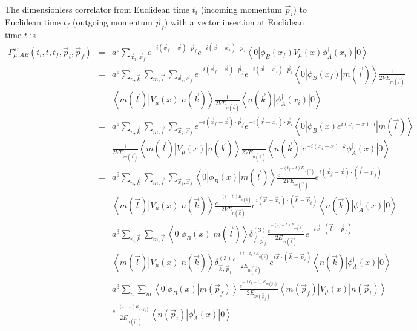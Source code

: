 \documentclass[12pt]{article}
\begin{document}
The dimensionless correlator from Euclidean time $t_i$ (incoming momentum
${\vec p}_i$) to Euclidean time $t_f$ (outgoing momentum $\vec{p}_f$) with a
vector insertion at Euclidean time $t$ is
\begin{eqnarray}
\Gamma^{\pi\pi}_{\mu,AB}(t_i,t,t_f,\vec{p}_i,\vec{p}_f)
 &=& a^9\sum_{\vec{x}_i,\vec{x}_f}e^{-i(\vec{x}_f-\vec{x})\cdot\vec{p}_f}
     e^{-i(\vec{x}-\vec{x}_i)\cdot\vec{p}_i}
     \left<0\left|\phi_B(x_f)V_\mu(x)\phi_A^\dagger(x_i)\right|0\right>
     \nonumber \\
 &=& a^9\sum_{n,\vec{k}}\sum_{m,\vec{l}}\sum_{\vec{x}_i,\vec{x}_f}
     e^{-i(\vec{x}_f-\vec{x})\cdot\vec{p}_f}
     e^{-i(\vec{x}-\vec{x}_i)\cdot\vec{p}_i}
     \left<0\left|\phi_B(x_f)\right|m(\vec{l})\right>
     \frac{1}{2VE_{m(\vec{l})}} \nonumber \\
  && \left<m(\vec{l})\left|V_\mu(x)\right|n(\vec{k})\right>
     \frac{1}{2VE_{n(\vec{k})}}
     \left<n(\vec{k})\left|\phi_A^\dagger(x_i)\right|0\right> \nonumber \\
 &=& a^9\sum_{n,\vec{k}}\sum_{m,\vec{l}}\sum_{\vec{x}_i,\vec{x}_f}
     e^{-i(\vec{x}_f-\vec{x})\cdot\vec{p}_f}
     e^{-i(\vec{x}-\vec{x}_i)\cdot\vec{p}_i}
     \left<0\left|\phi_B(x)e^{i(x_f-x)\cdot l}\right|m(\vec{l})\right>
     \nonumber \\
  && \frac{1}{2VE_{m(\vec{l})}}
     \left<m(\vec{l})\left|V_\mu(x)\right|n(\vec{k})\right>
     \frac{1}{2VE_{n(\vec{k})}}
     \left<n(\vec{k})\left|e^{-i(x_i-x)\cdot k}\phi_A^\dagger(x)\right|0\right>
     \nonumber \\
 &=& a^9\sum_{n,\vec{k}}\sum_{m,\vec{l}}\sum_{\vec{x}_i,\vec{x}_f}
     \left<0\left|\phi_B(x)\right|m(\vec{l})\right>
     \frac{e^{-(t_f-t)E_{m(\vec{l})}}}{2VE_{m(\vec{l})}}
     e^{i(\vec{x}_f-\vec{x})\cdot(\vec{l}-\vec{p}_f)} \nonumber \\
  && \left<m(\vec{l})\left|V_\mu(x)\right|n(\vec{k})\right>
     \frac{e^{-(t-t_i)E_{n(\vec{k})}}}{2VE_{n(\vec{k})}}
     e^{i(\vec{x}-\vec{x}_i)\cdot(\vec{k}-\vec{p}_i)}
     \left<n(\vec{k})\left|\phi_A^\dagger(x)\right|0\right> \nonumber \\
 &=& a^3\sum_{n,\vec{k}}\sum_{m,\vec{l}}
     \left<0\left|\phi_B(x)\right|m(\vec{l})\right>
     \delta^{(3)}_{\vec{l},\vec{p}_f}
     \frac{e^{-(t_f-t)E_{m(\vec{l})}}}{2E_{m(\vec{l})}}
     e^{-i\vec{x}\cdot(\vec{l}-\vec{p}_f)} \nonumber \\
  && \left<m(\vec{l})\left|V_\mu(x)\right|n(\vec{k})\right>
     \delta^{(3)}_{\vec{k},\vec{p}_i}
     \frac{e^{-(t-t_i)E_{n(\vec{k})}}}{2E_{n(\vec{k})}}
     e^{i\vec{x}\cdot(\vec{k}-\vec{p}_i)}
     \left<n(\vec{k})\left|\phi_A^\dagger(x)\right|0\right> \nonumber \\
 &=& a^3\sum_n\sum_m\left<0\left|\phi_B(x)\right|m(\vec{p}_f)\right>
     \frac{e^{-(t_f-t)E_{m(\vec{p}_f)}}}{2E_{m(\vec{p}_f)}}
     \left<m(\vec{p}_f)\left|V_\mu(x)\right|n(\vec{p}_i)\right> \nonumber \\
  && \frac{e^{-(t-t_i)E_{n(\vec{p}_i)}}}{2E_{n(\vec{p}_i)}}
     \left<n(\vec{p}_i)\left|\phi_A^\dagger(x)\right|0\right> \nonumber
\end{eqnarray}
\end{document}
